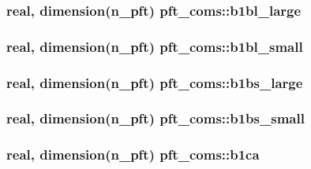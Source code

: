 \subsubsection[{b1bl\+\_\+large}]{\setlength{\rightskip}{0pt plus 5cm}real, dimension(n\+\_\+pft) pft\+\_\+coms\+::b1bl\+\_\+large}\label{namespacepft__coms_a214f419aed39937155b3b0e22ef55437}
\hypertarget{namespacepft__coms_acec323ee151ee47b0173bc85ef816453}{}
\subsubsection[{b1bl\+\_\+small}]{\setlength{\rightskip}{0pt plus 5cm}real, dimension(n\+\_\+pft) pft\+\_\+coms\+::b1bl\+\_\+small}\label{namespacepft__coms_acec323ee151ee47b0173bc85ef816453}
\hypertarget{namespacepft__coms_a5a61d97876e834a3e2618c85a2310bba}{}
\subsubsection[{b1bs\+\_\+large}]{\setlength{\rightskip}{0pt plus 5cm}real, dimension(n\+\_\+pft) pft\+\_\+coms\+::b1bs\+\_\+large}\label{namespacepft__coms_a5a61d97876e834a3e2618c85a2310bba}
\hypertarget{namespacepft__coms_a9a7ea1fec116893e64d9d8ace1c14e0c}{}
\subsubsection[{b1bs\+\_\+small}]{\setlength{\rightskip}{0pt plus 5cm}real, dimension(n\+\_\+pft) pft\+\_\+coms\+::b1bs\+\_\+small}\label{namespacepft__coms_a9a7ea1fec116893e64d9d8ace1c14e0c}
\hypertarget{namespacepft__coms_a56ccfd1fc49345702eb25a9a9f4a5756}{}
\subsubsection[{b1ca}]{\setlength{\rightskip}{0pt plus 5cm}real, dimension(n\+\_\+pft) pft\+\_\+coms\+::b1ca}\label{namespacepft__coms_a56ccfd1fc49345702eb25a9a9f4a5756}
\hypertarget{namespacepft__coms_ad31da22766c6db6bf3f24498eab8d22d}{}
